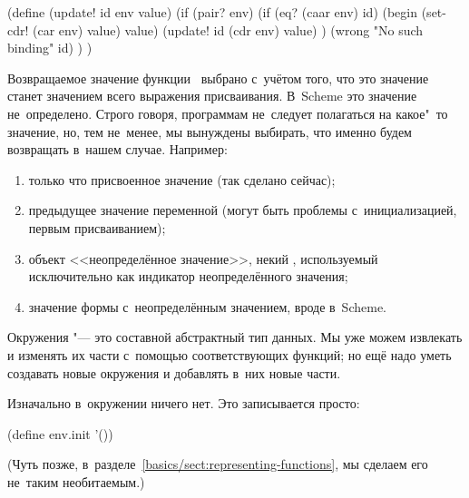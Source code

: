 \begin{code:lisp}
(define (update! id env value)
  (if (pair? env)
      (if (eq? (caar env) id)
          (begin (set-cdr! (car env) value)
                 value)
          (update! id (cdr env) value) )
      (wrong "No such binding" id) ) )
\end{code:lisp}


Возвращаемое значение функции~ выбрано с~учётом того, что это
значение станет значением всего выражения присваивания. В~Scheme это значение
не~определено. Строго говоря, программам не~следует полагаться на какое"~то
значение, но, тем не~менее, мы вынуждены выбирать, что именно будем возвращать
в~нашем случае. Например:

\begin{enumerate}
  \item только что присвоенное значение (так сделано сейчас);
  
  \item предыдущее значение переменной (могут быть проблемы
        с~инициализацией, первым присваиванием);
  
  \item {}\label{basics/s:env/ufo}
        объект <<неопределённое значение>>, некий ,
        используемый исключительно как индикатор неопределённого
        значения;
  
  \item значение формы с~неопределённым значением, вроде
         в~Scheme.
\end{enumerate}

Окружения "--- это составной абстрактный тип данных. Мы уже можем извлекать и
изменять их части с~помощью соответствующих функций; но ещё надо уметь
создавать новые окружения и добавлять в~них новые части.

Изначально в~окружении ничего нет. Это записывается просто:

\begin{code:lisp}
(define env.init '())
\end{code:lisp}

(Чуть позже, в~разделе~\ref{basics/sect:representing-functions}, мы сделаем его
не~таким необитаемым.)

